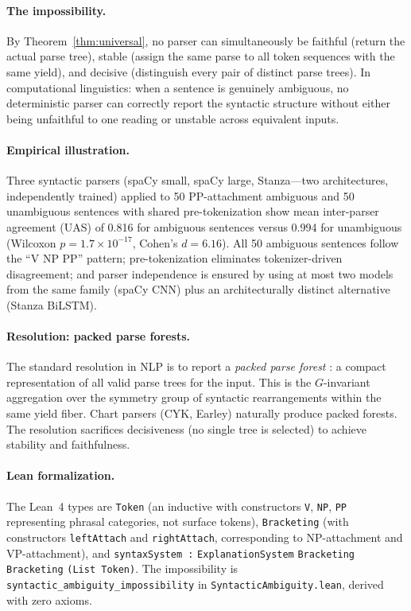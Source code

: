 \paragraph{The impossibility.}
By Theorem~\ref{thm:universal}, no parser can simultaneously be faithful
(return the actual parse tree), stable (assign the same parse to all token
sequences with the same yield), and decisive (distinguish every pair of
distinct parse trees).  In computational linguistics: when a sentence is
genuinely ambiguous, no deterministic parser can correctly report the syntactic
structure without either being unfaithful to one reading or unstable across
equivalent inputs.

\paragraph{Empirical illustration.}
Three syntactic parsers (spaCy small, spaCy large, Stanza---two architectures,
independently trained) applied to 50 PP-attachment ambiguous and 50 unambiguous
sentences with shared pre-tokenization show mean inter-parser agreement (UAS) of
0.816 for ambiguous sentences versus 0.994 for unambiguous (Wilcoxon
$p = 1.7 \times 10^{-17}$, Cohen's $d = 6.16$).  All 50 ambiguous sentences
follow the ``V NP PP'' pattern; pre-tokenization eliminates tokenizer-driven
disagreement; and parser independence is ensured by using at most two models
from the same family (spaCy CNN) plus an architecturally distinct alternative
(Stanza BiLSTM).

\paragraph{Resolution: packed parse forests.}
The standard resolution in NLP is to report a \emph{packed parse forest}
\citep{jurafsky2024}: a compact representation of all valid parse trees for
the input.  This is the $G$-invariant aggregation over the symmetry group of
syntactic rearrangements within the same yield fiber.  Chart parsers (CYK,
Earley) naturally produce packed forests.  The resolution sacrifices
decisiveness (no single tree is selected) to achieve stability and
faithfulness.

\paragraph{Lean formalization.}
The Lean~4 types are \texttt{Token} (an inductive with constructors \texttt{V},
\texttt{NP}, \texttt{PP} representing phrasal categories, not surface tokens),
\texttt{Bracketing} (with constructors \texttt{leftAttach} and
\texttt{rightAttach}, corresponding to NP-attachment and VP-attachment), and
\texttt{syntaxSystem\,:} \texttt{ExplanationSystem} \texttt{Bracketing} \texttt{Bracketing} \texttt{(List Token)}.
The impossibility is \texttt{syntactic\_ambiguity\_impossibility} in
\texttt{SyntacticAmbiguity.lean}, derived with zero axioms.
